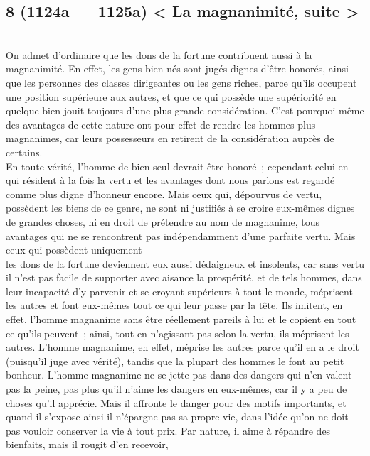 \documentclass[french,twoside]{book} %
\begin{document}
\subsection[{8 (1124a — 1125a) < La magnanimité, suite >}]{8 (1124a — 1125a) < La magnanimité, suite >}
\noindent \\
On admet d’ordinaire que les dons de la fortune contribuent aussi à la magnanimité. En effet, les gens bien nés sont jugés dignes d’être honorés, ainsi que les personnes des classes dirigeantes ou les gens riches, parce qu’ils occupent une position supérieure aux autres, et que ce qui possède une supériorité en quelque bien jouit toujours d’une plus grande considération. C’est pourquoi même des avantages de cette nature ont pour effet de rendre les hommes plus magnanimes, car leurs possesseurs en retirent de la considération auprès de certains. \\
En toute vérité, l’homme de bien seul devrait être honoré ; cependant celui en qui résident à la fois la vertu et les avantages dont nous parlons est regardé comme plus digne d’honneur encore. Mais ceux qui, dépourvus de vertu, possèdent les biens de ce genre, ne sont ni justifiés à se croire eux-mêmes dignes de grandes choses, ni en droit de prétendre au nom de magnanime, tous avantages qui ne se rencontrent pas indépendamment d’une parfaite vertu. Mais ceux qui possèdent uniquement \\
les dons de la fortune deviennent eux aussi dédaigneux et insolents, car sans vertu il n’est pas facile de supporter avec aisance la prospérité, et de tels hommes, dans leur incapacité  d’y parvenir et se croyant supérieurs à tout le monde, méprisent les autres et font eux-mêmes tout ce qui leur passe par la tête. Ils imitent, en effet, l’homme magnanime sans être réellement pareils à lui et le copient en tout ce qu’ils peuvent ; ainsi, tout en n’agissant pas selon la vertu, ils méprisent les \\
autres. L’homme magnanime, en effet, méprise les autres parce qu’il en a le droit (puisqu’il juge avec vérité), tandis que la plupart des hommes le font au petit bonheur. L’homme magnanime ne se jette pas dans des dangers qui n’en valent pas la peine, pas plus qu’il n’aime les dangers en eux-mêmes, car il y a peu de choses qu’il apprécie. Mais il affronte le danger pour des motifs importants, et quand il s’expose ainsi il n’épargne pas sa propre vie, dans l’idée qu’on ne doit pas vouloir conserver la vie à tout prix. Par nature, il aime à répandre des bienfaits, mais il rougit d’en recevoir, \\
\end{document}
